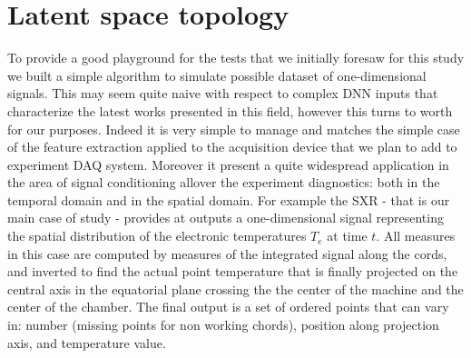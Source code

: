 \section{Latent space topology}

To provide a good playground for the tests that we initially foresaw for this study we built a simple algorithm to simulate possible dataset of one-dimensional signals. This may seem quite naive with respect to complex \acs{DNN} inputs that characterize the latest works presented in this field, however this turns to worth for our purposes. Indeed it is very simple to manage and matches the simple case of the feature extraction applied to the acquisition device that we plan to add to experiment \acs{DAQ} system. Moreover it present a quite widespread application in the area of signal conditioning allover the experiment diagnostics: both in the temporal domain and in the spatial domain. For example the \acs{SXR} - that is our main case of study - provides at outputs a one-dimensional signal representing the spatial distribution of the electronic temperatures $T_e$ at time $t$. All measures in this case are computed by measures of the integrated signal along the cords, and inverted to find the actual point temperature that is finally projected on the central axis in the equatorial plane crossing the the center of the machine and the center of the chamber. The final output is a set of ordered points that can vary in: number (missing points for non working chords), position along projection axis, and temperature value.

